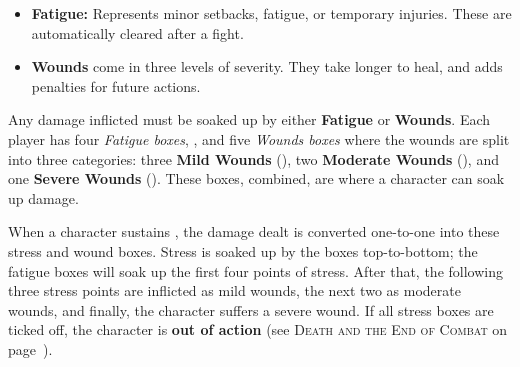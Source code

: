 \begin{Example}
	\begin{itemize}
    	\item \textbf{Fatigue:} Represents minor setbacks, fatigue, or temporary injuries. These are automatically cleared after a fight.
	    \item \textbf{Wounds} come in three levels of severity. They take longer to heal, and adds penalties for future actions.
	\end{itemize}
\end{Example}

Any damage inflicted must be soaked up by either \textbf{Fatigue} or \textbf{Wounds}. Each player has four \emph{Fatigue boxes}, \FatigueBoxes, and five \emph{Wounds boxes} where the wounds are split into three categories: three \textbf{Mild Wounds} (\MildWounds), two \textbf{Moderate Wounds} (\ModerateWounds), and one \textbf{Severe Wounds} (\SevereWounds). These boxes, combined, are where a character can soak up damage.

\DamageBox

When a character sustains \Damage, the damage dealt is converted one-to-one into these stress and wound boxes. Stress is soaked up by the boxes top-to-bottom; the fatigue boxes will soak up the first four points of stress. After that, the following three stress points are inflicted as mild wounds, the next two as moderate wounds, and finally, the character suffers a severe wound. If all stress boxes are ticked off, the character is \textbf{out of action} (see \textsc{Death and the End of Combat} on page~).

